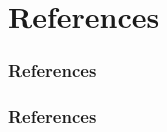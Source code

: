 \documentclass{Beamer}
\begin{document}
\section{References}


\begin{frame}[allowframebreaks]
\frametitle{References}


\frametitle{References}


\end{frame}

%
%



\end{document}
